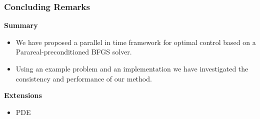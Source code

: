 \documentclass[9pt]{beamer}
\begin{document}
\begin{frame}
\frametitle{Concluding Remarks}
\textbf{Summary}
\begin{itemize}
\item{We have proposed a parallel in time framework for optimal control based on a Parareal-preconditioned BFGS solver.}
\item{Using an example problem and an implementation we have investigated the consistency and performance of our method.}
\end{itemize}
\textbf{Extensions}
\begin{itemize}
\item{PDE}
\end{itemize}
\end{frame}
\end{document}

